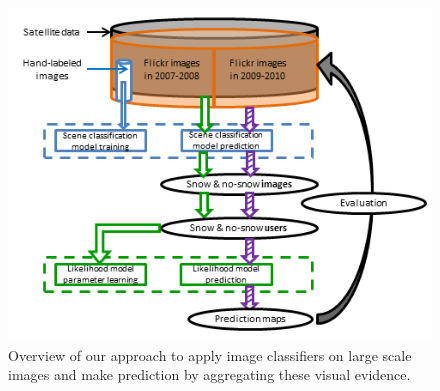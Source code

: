 \begin{figure}
\centering
\includegraphics[scale=1]{figure/flowchartWevaluation.png}
\caption{Overview of our approach to apply image classifiers on large scale images and make prediction by aggregating these visual evidence.}
\label{fig:overview}
\end{figure}

